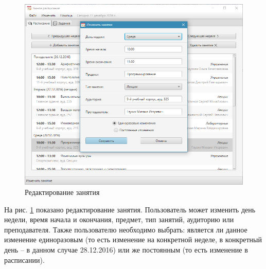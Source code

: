 \begin{figure}[H]
	\begin{center}
		\includegraphics[scale=0.8]{pics/6}
		\caption{Редактирование занятия} 
		\label{pic:6} %
	\end{center}
\end{figure}
На рис. \ref{pic:6} показано редактирование занятия. Пользователь может изменить день недели, время начала и окончания, предмет, тип занятий, аудиторию или преподавателя. Также пользователю необходимо выбрать: является ли данное изменение единоразовым (то есть изменение на конкретной неделе, в конкретный день -- в данном случае 28.12.2016) или же постоянным (то есть изменение в расписании).

